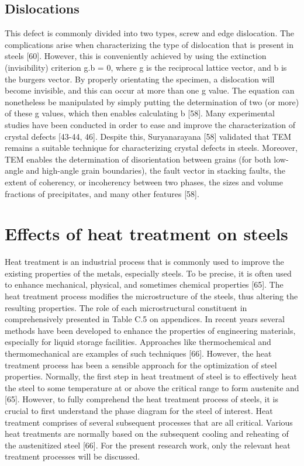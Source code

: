 \documentclass[12pt]{report}
\begin{document}
\subsection{Dislocations}   
This defect is commonly divided into two types, screw and edge dislocation. The complications arise when characterizing the type of dislocation that is present in steels [60]. However, this is conveniently achieved by using the extinction (invisibility) criterion g.b = 0, where g is the reciprocal lattice vector, and b is the burgers vector. By properly orientating the specimen, a dislocation will become invisible, and this can occur at more than one g value. The equation can nonetheless be manipulated by simply putting the determination of two (or more) of these g values, which then enables calculating b [58]. 
Many experimental studies have been conducted in order to ease and improve the characterization of crystal defects [43-44, 46]. Despite this, Suryanarayana [58] validated that TEM remains a suitable technique for characterizing crystal defects in steels. Moreover, TEM enables the determination of disorientation between grains (for both low-angle and high-angle grain boundaries), the fault vector in stacking faults, the extent of coherency, or incoherency between two phases, the sizes and volume fractions of precipitates, and many other features [58].

\section{Effects of heat treatment on steels} 
Heat treatment is an industrial process that is commonly used to improve the existing properties of the metals, especially steels. To be precise, it is often used to enhance mechanical, physical, and sometimes chemical properties [65]. The heat treatment process modifies the microstructure of the steels, thus altering the resulting properties. The role of each microstructural constituent in comprehensively presented in Table C.5 on appendices. In recent years several methods have been developed to enhance the properties of engineering materials, especially for liquid storage facilities. Approaches like thermochemical and thermomechanical are examples of such techniques [66]. However, the heat treatment process has been a sensible approach for the optimization of steel properties.
Normally, the first step in heat treatment of steel is to effectively heat the steel to some temperature at or above the critical range to form austenite and  [65]. However, to fully comprehend the heat treatment process of steels, it is crucial to first understand the phase diagram for the steel of interest. Heat treatment comprises of several subsequent processes that are all critical. Various heat treatments are normally based on the subsequent cooling and reheating of the austenitized steel [66].  For the present research work, only the relevant heat treatment processes will be discussed.
\end{document}

